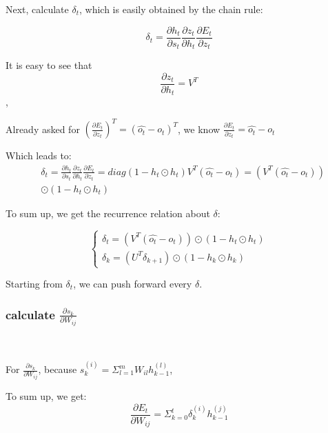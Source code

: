 \documentclass[oneside,solution]{seu-ml-assign}
\begin{document}
Next, calculate $\delta_t$, which is easily obtained by the chain rule:

\begin{equation}\delta_t=\frac{\partial h_t}{\partial s_t}\frac{\partial z_t}{\partial h_t}\frac{\partial E_t}{\partial z_t}\end{equation}

It is easy to see that \begin{equation}\frac{\partial z_t}{\partial h_t}=V^T\end{equation},

Already asked for $(\frac{\partial E_{t}}{\partial z_{t}})^{T}=(\hat{o_{t}}-o_{t})^{T}$, we know $\frac{\partial E_{t}}{\partial z_{t}}=\hat{o_{t}}-o_{t}$

Which leads to:
\begin{equation}\begin{aligned}   & \delta_t=\frac{\partial h_t}{\partial s_t}\frac{\partial z_t}{\partial h_t}\frac{\partial E_t}{\partial z_t}
                 =diag(1-h_t\odot h_t)V^T(\hat{o_t}-o_t)=(V^T(\hat{o_t}-o_t))                                                    \\&\odot(1-h_t\odot h_t)\end{aligned}\end{equation}

To sum up, we get the recurrence relation about $\delta$:

\begin{equation}\left.\left\{\begin{array}{l}\delta_t=(V^T(\hat{o_t}-o_t))\odot(1-h_t\odot h_t)\\\delta_k=(U^T\delta_{k+1})\odot(1-h_k\odot h_k)\end{array}\right.\right.\end{equation}

Starting from $\delta_t$, we can push forward every $\delta$.

\subsubsection{calculate $\frac{\partial s_k }{ \partial W_{ij} }$}
\

For $\frac{\partial s_k }{ \partial W_{ij} }$, because $s_k^{(i)}=\Sigma_{l=1}^mW_{il}h_{k-1}^{(l)}$,


To sum up, we get:
\begin{equation}\frac{\partial E_t}{\partial W_{ij}}=\Sigma_{k=0}^t\delta_k^{(i)}h_{k-1}^{(j)}\end{equation}
\end{document}
